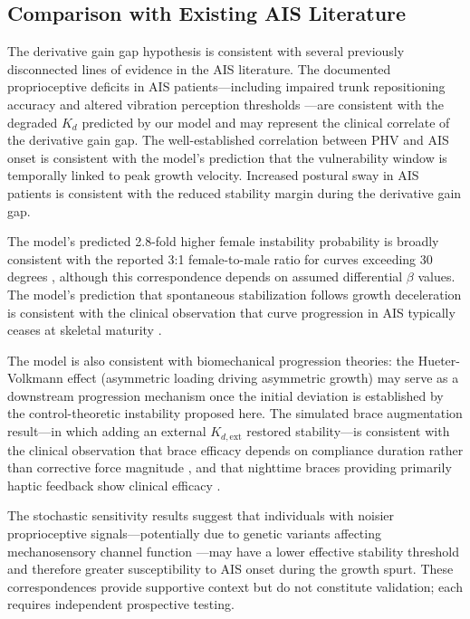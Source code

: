 \documentclass[12pt,a4paper]{article}
\begin{document}
\subsection{Comparison with Existing AIS Literature}

The derivative gain gap hypothesis is consistent with several previously disconnected lines of evidence in the AIS literature. The documented proprioceptive deficits in AIS patients---including impaired trunk repositioning accuracy and altered vibration perception thresholds \citep{lao2008proprioceptive, simoneau2006altered}---are consistent with the degraded $K_d$ predicted by our model and may represent the clinical correlate of the derivative gain gap. The well-established correlation between PHV and AIS onset \citep{sanders2017maturity, burwell2009aetiopathogenesis} is consistent with the model's prediction that the vulnerability window is temporally linked to peak growth velocity. Increased postural sway in AIS patients \citep{dalleau2012postural} is consistent with the reduced stability margin during the derivative gain gap.

The model's predicted 2.8-fold higher female instability probability is broadly consistent with the reported 3:1 female-to-male ratio for curves exceeding 30 degrees \citep{cheng2015prevalence}, although this correspondence depends on assumed differential $\beta$ values. The model's prediction that spontaneous stabilization follows growth deceleration is consistent with the clinical observation that curve progression in AIS typically ceases at skeletal maturity \citep{weinstein2008natural}.

The model is also consistent with biomechanical progression theories: the Hueter-Volkmann effect (asymmetric loading driving asymmetric growth) \citep{stokes2006hueter, villemure2009growth} may serve as a downstream progression mechanism once the initial deviation is established by the control-theoretic instability proposed here. The simulated brace augmentation result---in which adding an external $K_{d,\text{ext}}$ restored stability---is consistent with the clinical observation that brace efficacy depends on compliance duration rather than corrective force magnitude \citep{weinstein2013bracing, negrini2018sosort}, and that nighttime braces providing primarily haptic feedback show clinical efficacy \citep{price1997efficacy}.

The stochastic sensitivity results suggest that individuals with noisier proprioceptive signals---potentially due to genetic variants affecting mechanosensory channel function \citep{assaraf2020piezo2, coste2010piezo}---may have a lower effective stability threshold and therefore greater susceptibility to AIS onset during the growth spurt. These correspondences provide supportive context but do not constitute validation; each requires independent prospective testing.
\end{document}

